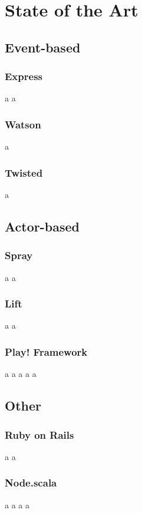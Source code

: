 \chapter{State of the Art}

\section{Event-based}

\subsection{Express} \newpage a \newpage a

\subsection{Watson} \newpage a

\subsection{Twisted} \newpage a



\section{Actor-based}

\subsection{Spray} \newpage a \newpage a

\subsection{Lift} \newpage a \newpage a

\subsection{Play! Framework} \newpage a \newpage a \newpage a \newpage a \newpage a



\section{Other}

\subsection{Ruby on Rails} \newpage a \newpage a

\subsection{Node.scala} \newpage a \newpage a \newpage a \newpage a